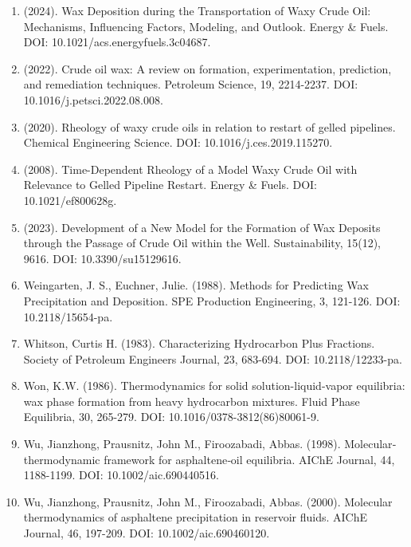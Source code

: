 \documentclass[11pt]{extarticle}
\begin{document}
\begin{enumerate}
  John A. Svendsen. (1993). Mathematical modeling of wax deposition in oil pipeline systems. AIChE Journal, 39, 1377-1388. DOI: 10.1002/aic.690390815.
\item
  (2024). Wax Deposition during the Transportation of Waxy Crude Oil: Mechanisms, Influencing Factors, Modeling, and Outlook. Energy \& Fuels. DOI: 10.1021/acs.energyfuels.3c04687.
\item
  (2022). Crude oil wax: A review on formation, experimentation, prediction, and remediation techniques. Petroleum Science, 19, 2214-2237. DOI: 10.1016/j.petsci.2022.08.008.
\item
  (2020). Rheology of waxy crude oils in relation to restart of gelled pipelines. Chemical Engineering Science. DOI: 10.1016/j.ces.2019.115270.
\item
  (2008). Time-Dependent Rheology of a Model Waxy Crude Oil with Relevance to Gelled Pipeline Restart. Energy \& Fuels. DOI: 10.1021/ef800628g.
\item
  (2023). Development of a New Model for the Formation of Wax Deposits through the Passage of Crude Oil within the Well. Sustainability, 15(12), 9616. DOI: 10.3390/su15129616.
\item
  Weingarten, J. S., Euchner, Julie. (1988). Methods for Predicting Wax Precipitation and Deposition. SPE Production Engineering, 3, 121-126. DOI: 10.2118/15654-pa.
\item
  Whitson, Curtis H. (1983). Characterizing Hydrocarbon Plus Fractions. Society of Petroleum Engineers Journal, 23, 683-694. DOI: 10.2118/12233-pa.
\item
  Won, K.W. (1986). Thermodynamics for solid solution-liquid-vapor equilibria: wax phase formation from heavy hydrocarbon mixtures. Fluid Phase Equilibria, 30, 265-279. DOI: 10.1016/0378-3812(86)80061-9.
\item
  Wu, Jianzhong, Prausnitz, John M., Firoozabadi, Abbas. (1998). Molecular‐thermodynamic framework for asphaltene‐oil equilibria. AIChE Journal, 44, 1188-1199. DOI: 10.1002/aic.690440516.
\item
  Wu, Jianzhong, Prausnitz, John M., Firoozabadi, Abbas. (2000). Molecular thermodynamics of asphaltene precipitation in reservoir fluids. AIChE Journal, 46, 197-209. DOI: 10.1002/aic.690460120.
\end{enumerate}
\end{document}
